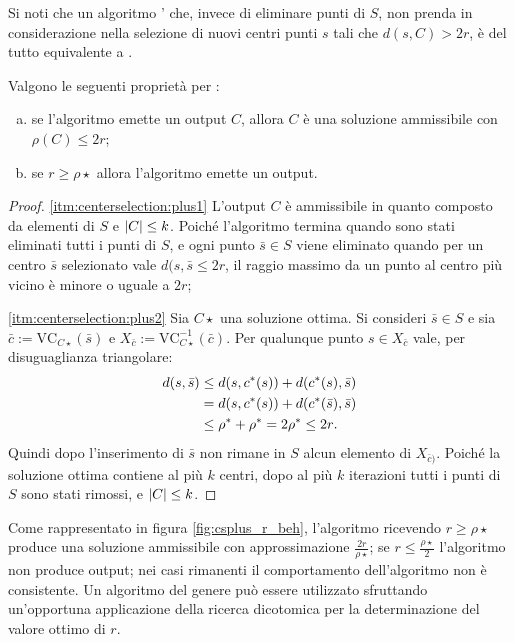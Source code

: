 Si noti che un algoritmo \CenterSelectionPlus' che, invece di eliminare punti di $S$, non prenda in considerazione nella selezione di nuovi centri punti $s$ tali che $d(s,C)>2r$, è del tutto equivalente a \CenterSelectionPlus.
\begin{theorem}
	Valgono le seguenti proprietà per \CenterSelectionPlus:
	\begin{enumerate}[(a)]
		\item \label{itm:centerselection:plus1} se l'algoritmo emette un output $C$, allora $C$ è una soluzione ammissibile con $\rho(C)\leq 2r$;
		\item \label{itm:centerselection:plus2} se $r\geq\rho\star$ allora l'algoritmo emette un output.
	\end{enumerate}
\end{theorem}
\begin{proof}
	\ref{itm:centerselection:plus1} L'output $C$ è ammissibile in quanto composto da elementi di $S$ e $\card C\leq k$. Poiché l'algoritmo termina quando sono stati eliminati tutti i punti di $S$, e ogni punto $\bar s\in S$ viene eliminato quando per un centro $\bar s$ selezionato vale $d(s,\bar s\leq 2r$, il raggio massimo da un punto al centro più vicino è minore o uguale a $2r$;

	\ref{itm:centerselection:plus2} Sia $C\star$ una soluzione ottima. Si consideri $\bar s\in S$ e sia $\bar c:=\text{VC}_{C\star}(\bar s)$ e $X_{\bar c}:=\text{VC}_{C\star}^{-1}(\bar c)$.
	Per qualunque punto $s\in X_{\bar c}$ vale, per disuguaglianza triangolare:
	\begin{align*}
		d(s,\bar s) & \leq d(s,c\star(s))+d(c\star(s),\bar s)                \\
		            & = d(s,c\star(s))+d(c\star(\bar s),\bar s)              \\
		            & \leq \rho\star + \rho\star = 2\rho\star \leq 2r \text.
	\end{align*}
	Quindi dopo l'inserimento di $\bar s$ non rimane in $S$ alcun elemento di $X_{\bar c)}$. Poiché la soluzione ottima contiene al più $k$ centri, dopo al più $k$ iterazioni tutti i punti di $S$ sono stati rimossi, e $\card C\leq k$.
\end{proof}


Come rappresentato in figura \ref{fig:csplus_r_beh}, l'algoritmo ricevendo $r\geq\rho\star$ produce una soluzione ammissibile con approssimazione $\frac{2r}{\rho\star}$; se $r\leq\frac{\rho\star}{2}$ l'algoritmo non produce output; nei casi rimanenti il comportamento dell'algoritmo non è consistente.
Un algoritmo del genere può essere utilizzato sfruttando un'opportuna applicazione della ricerca dicotomica per la determinazione del valore ottimo di $r$.


